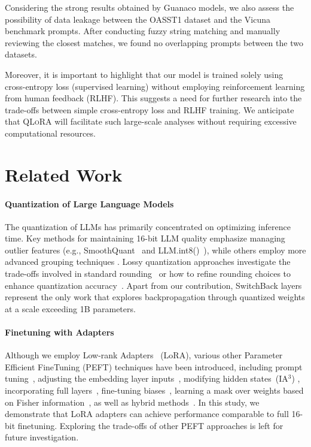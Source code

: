 Considering the strong results obtained by {Guanaco} models, we also assess the possibility of data leakage between the OASST1 dataset and the Vicuna benchmark prompts. After conducting fuzzy string matching and manually reviewing the closest matches, we found no overlapping prompts between the two datasets.

Moreover, it is important to highlight that our model is trained solely using cross-entropy loss (supervised learning) without employing reinforcement learning from human feedback (RLHF). This suggests a need for further research into the trade-offs between simple cross-entropy loss and RLHF training. We anticipate that \textsc{QLoRA} will facilitate such large-scale analyses without requiring excessive computational resources.

\section{Related Work}

\paragraph{Quantization of Large Language Models} The quantization of LLMs has primarily concentrated on optimizing inference time. Key methods for maintaining 16-bit LLM quality emphasize managing outlier features (e.g., SmoothQuant~\citep{xiao2022smoothquant} and LLM.int8()~\citep{dettmers2022llm}), while others employ more advanced grouping techniques \citep{park2022nuqmm, yao2022zeroquant}. Lossy quantization approaches investigate the trade-offs involved in standard rounding~\citep{dettmers2022case,zeng2022glm,pope2022efficiently} or how to refine rounding choices to enhance quantization accuracy~\citep{frantar2022gptq}. Apart from our contribution, SwitchBack layers~\citep{wortsman2023stable} represent the only work that explores backpropagation through quantized weights at a scale exceeding 1B parameters.

\paragraph{Finetuning with Adapters} Although we employ Low-rank Adapters~\citep{hu2021lora} (LoRA), various other Parameter Efficient FineTuning (PEFT) techniques have been introduced, including prompt tuning~\citep{qin2021learning,lester2021power,li2021prefix}, adjusting the embedding layer inputs~\citep{an2022input}, modifying hidden states~(IA$^3$) \citep{liu2022few}, incorporating full layers~\citep{houlsby2019parameter}, fine-tuning biases~\citep{zaken2021bitfit}, learning a mask over weights based on Fisher information~\citep{sung2021training}, as well as hybrid methods~\citep{henderson2021compacter}. In this study, we demonstrate that LoRA adapters can achieve performance comparable to full 16-bit finetuning. Exploring the trade-offs of other PEFT approaches is left for future investigation.


